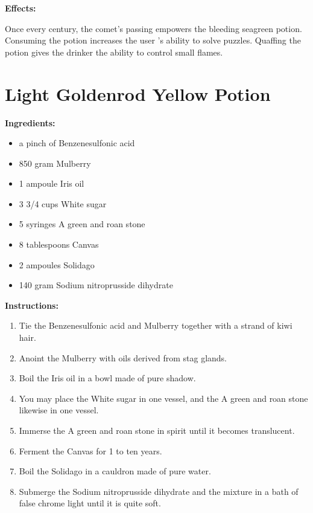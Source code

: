 \documentclass{article}
\begin{document}
\textbf{Effects:}

Once every century, the comet’s passing empowers the bleeding seagreen potion. Consuming the potion increases the user 's ability to solve puzzles. Quaffing the potion gives the drinker the ability to control small flames.

\newpage
\section*{Light Goldenrod Yellow Potion}

\textbf{Ingredients:}

\begin{itemize}
  \item a pinch of Benzenesulfonic acid
  \item 850 gram Mulberry
  \item 1 ampoule Iris oil
  \item 3 3/4 cups White sugar
  \item 5 syringes A green and roan stone
  \item 8 tablespoons Canvas
  \item 2 ampoules Solidago
  \item 140 gram Sodium nitroprusside dihydrate
\end{itemize}

\textbf{Instructions:}

\begin{enumerate}
  \item Tie the Benzenesulfonic acid and Mulberry together with a strand of kiwi hair.
  \item Anoint the Mulberry with oils derived from stag glands.
  \item Boil the Iris oil in a bowl made of pure shadow.
  \item You may place the White sugar in one vessel, and the A green and roan stone likewise in one vessel.
  \item Immerse the A green and roan stone in spirit until it becomes translucent.
  \item Ferment the Canvas for 1 to ten years.
  \item Boil the Solidago in a cauldron made of pure water.
  \item Submerge the Sodium nitroprusside dihydrate and the mixture in a bath of false chrome light until it is quite soft.
\end{enumerate}
\end{document}
